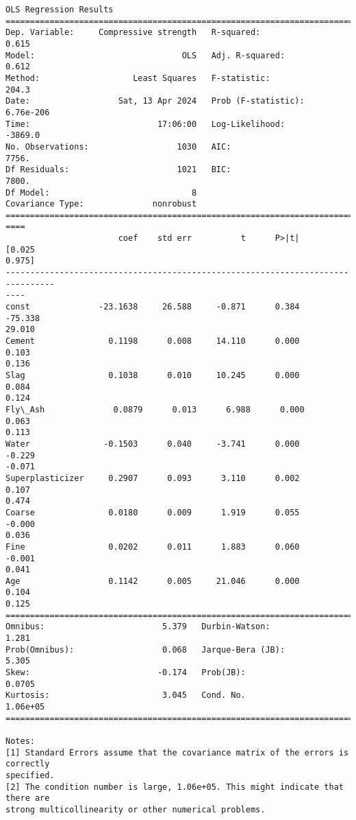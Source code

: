 \documentclass[11pt]{article}
\begin{document}
    \begin{Verbatim}[commandchars=\\\{\}]
                             OLS Regression Results
================================================================================
Dep. Variable:     Compressive strength   R-squared:                       0.615
Model:                              OLS   Adj. R-squared:                  0.612
Method:                   Least Squares   F-statistic:                     204.3
Date:                  Sat, 13 Apr 2024   Prob (F-statistic):          6.76e-206
Time:                          17:06:00   Log-Likelihood:                -3869.0
No. Observations:                  1030   AIC:                             7756.
Df Residuals:                      1021   BIC:                             7800.
Df Model:                             8
Covariance Type:              nonrobust
================================================================================
====
                       coef    std err          t      P>|t|      [0.025
0.975]
--------------------------------------------------------------------------------
----
const              -23.1638     26.588     -0.871      0.384     -75.338
29.010
Cement               0.1198      0.008     14.110      0.000       0.103
0.136
Slag                 0.1038      0.010     10.245      0.000       0.084
0.124
Fly\_Ash              0.0879      0.013      6.988      0.000       0.063
0.113
Water               -0.1503      0.040     -3.741      0.000      -0.229
-0.071
Superplasticizer     0.2907      0.093      3.110      0.002       0.107
0.474
Coarse               0.0180      0.009      1.919      0.055      -0.000
0.036
Fine                 0.0202      0.011      1.883      0.060      -0.001
0.041
Age                  0.1142      0.005     21.046      0.000       0.104
0.125
==============================================================================
Omnibus:                        5.379   Durbin-Watson:                   1.281
Prob(Omnibus):                  0.068   Jarque-Bera (JB):                5.305
Skew:                          -0.174   Prob(JB):                       0.0705
Kurtosis:                       3.045   Cond. No.                     1.06e+05
==============================================================================

Notes:
[1] Standard Errors assume that the covariance matrix of the errors is correctly
specified.
[2] The condition number is large, 1.06e+05. This might indicate that there are
strong multicollinearity or other numerical problems.
    \end{Verbatim}
\end{document}
